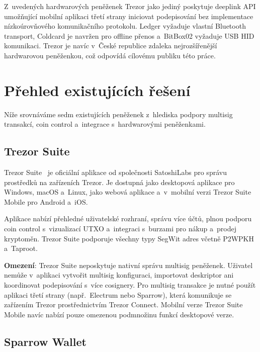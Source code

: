 Z~uvedených hardwarových peněženek Trezor jako jediný poskytuje deeplink
API umožňující mobilní aplikaci třetí strany iniciovat podepisování
bez implementace nízkoúrovňového komunikačního protokolu. Ledger vyžaduje
vlastní Bluetooth transport, Coldcard je navržen pro offline přenos
a~BitBox02 vyžaduje USB HID komunikaci. Trezor je navíc v~České republice
zdaleka nejrozšířenější hardwarovou peněženkou, což odpovídá cílovému
publiku této práce.


\section{Přehled existujících řešení}
\label{sec:existing-solutions}

Níže srovnáváme sedm existujících peněženek z~hlediska podpory multisig
transakcí, coin control a~integrace s~hardwarovými peněženkami.

\subsection{Trezor Suite}
\label{sec:trezor-suite}

Trezor Suite~\citep{TrezorSuite} je oficiální aplikace od společnosti
SatoshiLabs pro správu prostředků na zařízeních Trezor. Je dostupná jako
desktopová aplikace pro Windows, macOS a~Linux, jako webová aplikace
a~v~mobilní verzi Trezor Suite Mobile pro Android a~iOS.

Aplikace nabízí přehledné uživatelské rozhraní, správu více účtů, plnou
podporu coin control s~vizualizací UTXO a~integraci s~burzami pro nákup
a~prodej kryptoměn. Trezor Suite podporuje všechny typy SegWit adres včetně
P2WPKH a~Taproot.

\textbf{Omezení}: Trezor Suite neposkytuje nativní správu multisig peněženek.
Uživatel nemůže v~aplikaci vytvořit multisig konfiguraci, importovat
deskriptor ani koordinovat podepisování s~více cosignery. Pro multisig
transakce je nutné použít aplikaci třetí strany (např.\ Electrum nebo Sparrow),
která komunikuje se zařízením Trezor prostřednictvím Trezor Connect. Mobilní
verze Trezor Suite Mobile navíc nabízí pouze omezenou podmnožinu funkcí
desktopové verze.

\subsection{Sparrow Wallet}
\label{sec:sparrow}

